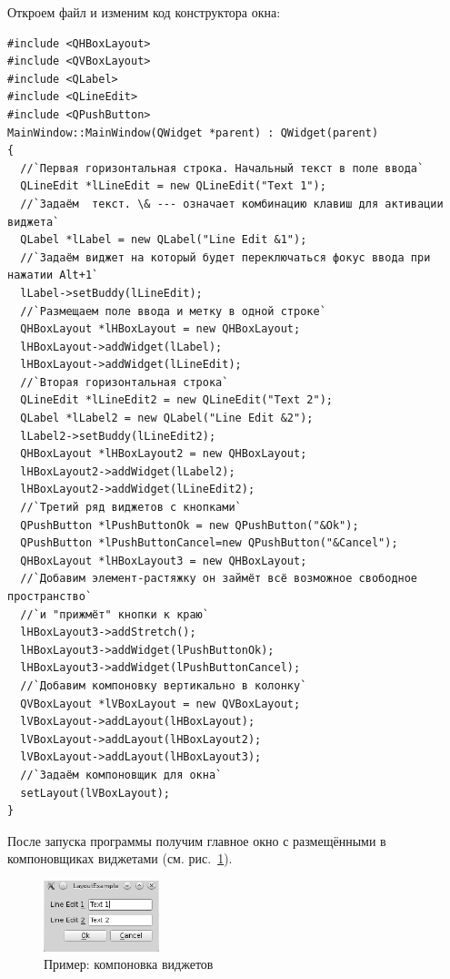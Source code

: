 Откроем файл  и изменим код конструктора окна:
\begin{lstlisting}
#include <QHBoxLayout>
#include <QVBoxLayout>
#include <QLabel>
#include <QLineEdit>
#include <QPushButton>
MainWindow::MainWindow(QWidget *parent) : QWidget(parent)
{
  //`Первая горизонтальная строка. Начальный текст в поле ввода`
  QLineEdit *lLineEdit = new QLineEdit("Text 1");
  //`Задаём  текст. \& --- означает комбинацию клавиш для активации виджета`
  QLabel *lLabel = new QLabel("Line Edit &1");
  //`Задаём виджет на который будет переключаться фокус ввода при нажатии Alt+1`
  lLabel->setBuddy(lLineEdit);
  //`Размещаем поле ввода и метку в одной строке`
  QHBoxLayout *lHBoxLayout = new QHBoxLayout;
  lHBoxLayout->addWidget(lLabel);
  lHBoxLayout->addWidget(lLineEdit);
  //`Вторая горизонтальная строка`
  QLineEdit *lLineEdit2 = new QLineEdit("Text 2");
  QLabel *lLabel2 = new QLabel("Line Edit &2");
  lLabel2->setBuddy(lLineEdit2);
  QHBoxLayout *lHBoxLayout2 = new QHBoxLayout;
  lHBoxLayout2->addWidget(lLabel2);
  lHBoxLayout2->addWidget(lLineEdit2);
  //`Третий ряд виджетов с кнопками`
  QPushButton *lPushButtonOk = new QPushButton("&Ok");
  QPushButton *lPushButtonCancel=new QPushButton("&Cancel");
  QHBoxLayout *lHBoxLayout3 = new QHBoxLayout;
  //`Добавим элемент-растяжку он займёт всё возможное свободное пространство`
  //`и "прижмёт" кнопки к краю`
  lHBoxLayout3->addStretch();
  lHBoxLayout3->addWidget(lPushButtonOk);
  lHBoxLayout3->addWidget(lPushButtonCancel);
  //`Добавим компоновку вертикально в колонку`
  QVBoxLayout *lVBoxLayout = new QVBoxLayout;
  lVBoxLayout->addLayout(lHBoxLayout);
  lVBoxLayout->addLayout(lHBoxLayout2);
  lVBoxLayout->addLayout(lHBoxLayout3);
  //`Задаём компоновщик для окна`
  setLayout(lVBoxLayout);
}
\end{lstlisting}

После запуска программы получим главное окно с размещёнными в компоновщиках  виджетами (см. рис.~\ref{ch13:refDrawing4}).
\begin{figure}[htb]
\begin{center}
\includegraphics[width=0.3\textwidth]{img/ris_13_5}
\caption[Пример: компоновка виджетов]{Пример: компоновка виджетов}
\label{ch13:refDrawing4}
\end{center}
\end{figure}

